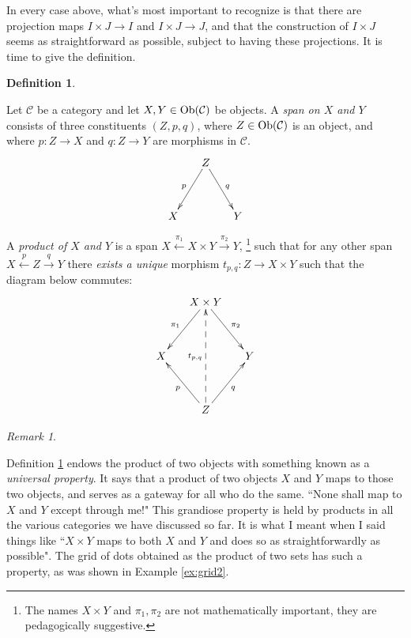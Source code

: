 \documentclass{book}
\def\tn{\textnormal}
\def\mc{\mathcal}
\def\Ob{\tn{Ob}}
\def\to{\rightarrow}
\def\taking{\colon}
\newcommand{\To}[1]{\xrightarrow{#1}}
\newcommand{\From}[1]{\xleftarrow{#1}}
\def\mcC{\mc{C}}
\theoremstyle{remark}
\newtheorem{remark}[subsubsection]{Remark}
\theoremstyle{definition}
\newtheorem{definition}[subsubsection]{Definition}
\begin{document}
In every case above, what's most important to recognize is that there are projection maps $I\times J\to I$ and $I\times J\to J$, and that the construction of $I\times J$ seems as straightforward as possible, subject to having these projections. It is time to give the definition.

\begin{definition}\label{def:products in a cat}

Let $\mcC$ be a category and let $X,Y\in\Ob(\mcC)$ be objects. A {\em span on $X$ and $Y$} consists of three constituents $(Z,p,q)$, where $Z\in\Ob(\mcC)$ is an object, and where $p\taking Z\to X$ and $q\taking Z\to Y$ are morphisms in $\mcC$. 
$$\xymatrix@=15pt{&Z\ar[ldd]_p\ar[rdd]^q\\\\X&&Y}$$   

A {\em product of $X$ and $Y$} is a span $X\From{\pi_1}X\times Y\To{\pi_2}Y$, \footnote{The names $X\times Y$ and $\pi_1,\pi_2$ are not mathematically important, they are pedagogically suggestive.} such that for any other span $X\From{p}Z\To{q}Y$ there {\em exists a unique} morphism $t_{p,q}\taking Z\to X\times Y$ such that the diagram below commutes:
$$
\xymatrix@=15pt{&X\times Y\ar[ldd]_{\pi_1}\ar[rdd]^{\pi_2}\\\\X&&Y\\\\&Z\ar[uul]^{p}\ar[uur]_q\ar@{-->}[uuuu]^{t_{p,q}}}
$$
\end{definition}

\begin{remark}\label{rem:gateway}

Definition \ref{def:products in a cat} endows the product of two objects with something known as a {\em universal property}. It says that a product of two objects $X$ and $Y$ maps to those two objects, and serves as a gateway for all who do the same. ``None shall map to $X$ and $Y$ except through me!" This grandiose property is held by  products in all the various categories we have discussed so far. It is what I meant when I said things like ``$X\times Y$ maps to both $X$ and $Y$ and does so as straightforwardly as possible".  The grid of dots obtained as the product of two sets has such a property, as was shown in Example \ref{ex:grid2}.

\end{remark}
\end{document}
